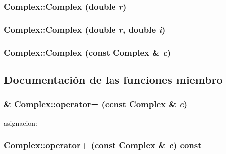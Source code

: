 \hypertarget{classComplex_d79a5d8db5595f6661f066e3a691ac40}{
\subsubsection{\setlength{\rightskip}{0pt plus 5cm}Complex::Complex (double {\em r})}}
\label{classComplex_d79a5d8db5595f6661f066e3a691ac40}


\hypertarget{classComplex_0a9ac766ecb69aa823210728b5238164}{
\subsubsection{\setlength{\rightskip}{0pt plus 5cm}Complex::Complex (double {\em r}, \/  double {\em i})}}
\label{classComplex_0a9ac766ecb69aa823210728b5238164}


\hypertarget{classComplex_d6b6aba985d85982e621b244c5533ce6}{
\subsubsection{\setlength{\rightskip}{0pt plus 5cm}Complex::Complex (const {\bf Complex} \& {\em c})}}
\label{classComplex_d6b6aba985d85982e621b244c5533ce6}




\subsection{Documentación de las funciones miembro}
\hypertarget{classComplex_d63f572bf5b643c714e388cda5c6f5cb}{
\subsubsection{ \& Complex::operator= (const {\bf Complex} \& {\em c})}}
\label{classComplex_d63f572bf5b643c714e388cda5c6f5cb}


asignacion: 

\hypertarget{classComplex_85335af4619e9e47aa9c0846d1d149b0}{
\subsubsection{ Complex::operator+ (const {\bf Complex} \& {\em c}) const}}
\label{classComplex_85335af4619e9e47aa9c0846d1d149b0}


